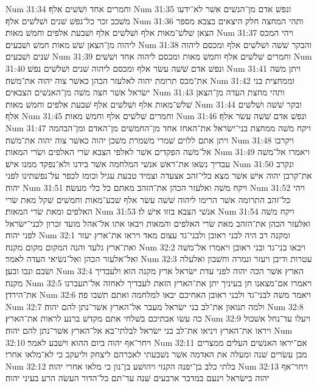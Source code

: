 Num 31:34  וחמרים אחד ושׁשׁים אלף׃
Num 31:35  ונפשׁ אדם מן־הנשׁים אשׁר לא־ידעו משׁכב זכר כל־נפשׁ שׁנים ושׁלשׁים אלף׃
Num 31:36  ותהי המחצה חלק היצאים בצבא מספר הצאן שׁלשׁ־מאות אלף ושׁלשׁים אלף ושׁבעת אלפים וחמשׁ מאות׃
Num 31:37  ויהי המכס ליהוה מן־הצאן שׁשׁ מאות חמשׁ ושׁבעים׃
Num 31:38  והבקר שׁשׁה ושׁלשׁים אלף ומכסם ליהוה שׁנים ושׁבעים׃
Num 31:39  וחמרים שׁלשׁים אלף וחמשׁ מאות ומכסם ליהוה אחד ושׁשׁים׃
Num 31:40  ונפשׁ אדם שׁשׁה עשׂר אלף ומכסם ליהוה שׁנים ושׁלשׁים נפשׁ׃
Num 31:41  ויתן משׁה את־מכס תרומת יהוה לאלעזר הכהן כאשׁר צוה יהוה את־משׁה׃
Num 31:42  וממחצית בני ישׂראל אשׁר חצה משׁה מן־האנשׁים הצבאים׃
Num 31:43  ותהי מחצת העדה מן־הצאן שׁלשׁ־מאות אלף ושׁלשׁים אלף שׁבעת אלפים וחמשׁ מאות׃
Num 31:44  ובקר שׁשׁה ושׁלשׁים אלף׃
Num 31:45  וחמרים שׁלשׁים אלף וחמשׁ מאות׃
Num 31:46  ונפשׁ אדם שׁשׁה עשׂר אלף׃
Num 31:47  ויקח משׁה ממחצת בני־ישׂראל את־האחז אחד מן־החמשׁים מן־האדם ומן־הבהמה ויתן אתם ללוים שׁמרי משׁמרת משׁכן יהוה כאשׁר צוה יהוה את־משׁה׃
Num 31:48  ויקרבו אל־משׁה הפקדים אשׁר לאלפי הצבא שׂרי האלפים ושׂרי המאות׃
Num 31:49  ויאמרו אל־משׁה עבדיך נשׂאו את־ראשׁ אנשׁי המלחמה אשׁר בידנו ולא־נפקד ממנו אישׁ׃
Num 31:50  ונקרב את־קרבן יהוה אישׁ אשׁר מצא כלי־זהב אצעדה וצמיד טבעת עגיל וכומז לכפר על־נפשׁתינו לפני יהוה׃
Num 31:51  ויקח משׁה ואלעזר הכהן את־הזהב מאתם כל כלי מעשׂה׃
Num 31:52  ויהי כל־זהב התרומה אשׁר הרימו ליהוה שׁשׁה עשׂר אלף שׁבע־מאות וחמשׁים שׁקל מאת שׂרי האלפים ומאת שׂרי המאות׃
Num 31:53  אנשׁי הצבא בזזו אישׁ לו׃
Num 31:54  ויקח משׁה ואלעזר הכהן את־הזהב מאת שׂרי האלפים והמאות ויבאו אתו אל־אהל מועד זכרון לבני־ישׂראל לפני יהוה׃
Num 32:1  ומקנה רב היה לבני ראובן ולבני־גד עצום מאד ויראו את־ארץ יעזר ואת־ארץ גלעד והנה המקום מקום מקנה׃
Num 32:2  ויבאו בני־גד ובני ראובן ויאמרו אל־משׁה ואל־אלעזר הכהן ואל־נשׂיאי העדה לאמר׃
Num 32:3  עטרות ודיבן ויעזר ונמרה וחשׁבון ואלעלה ושׂבם ונבו ובען׃
Num 32:4  הארץ אשׁר הכה יהוה לפני עדת ישׂראל ארץ מקנה הוא ולעבדיך מקנה׃
Num 32:5  ויאמרו אם־מצאנו חן בעיניך יתן את־הארץ הזאת לעבדיך לאחזה אל־תעברנו את־הירדן׃
Num 32:6  ויאמר משׁה לבני־גד ולבני ראובן האחיכם יבאו למלחמה ואתם תשׁבו פה׃
Num 32:7  ולמה תנואון את־לב בני ישׂראל מעבר אל־הארץ אשׁר־נתן להם יהוה׃
Num 32:8  כה עשׂו אבתיכם בשׁלחי אתם מקדשׁ ברנע לראות את־הארץ׃
Num 32:9  ויעלו עד־נחל אשׁכול ויראו את־הארץ ויניאו את־לב בני ישׂראל לבלתי־בא אל־הארץ אשׁר־נתן להם יהוה׃
Num 32:10  ויחר־אף יהוה ביום ההוא וישׁבע לאמר׃
Num 32:11  אם־יראו האנשׁים העלים ממצרים מבן עשׂרים שׁנה ומעלה את האדמה אשׁר נשׁבעתי לאברהם ליצחק וליעקב כי לא־מלאו אחרי׃
Num 32:12  בלתי כלב בן־יפנה הקנזי ויהושׁע בן־נון כי מלאו אחרי יהוה׃
Num 32:13  ויחר־אף יהוה בישׂראל וינעם במדבר ארבעים שׁנה עד־תם כל־הדור העשׂה הרע בעיני יהוה׃
